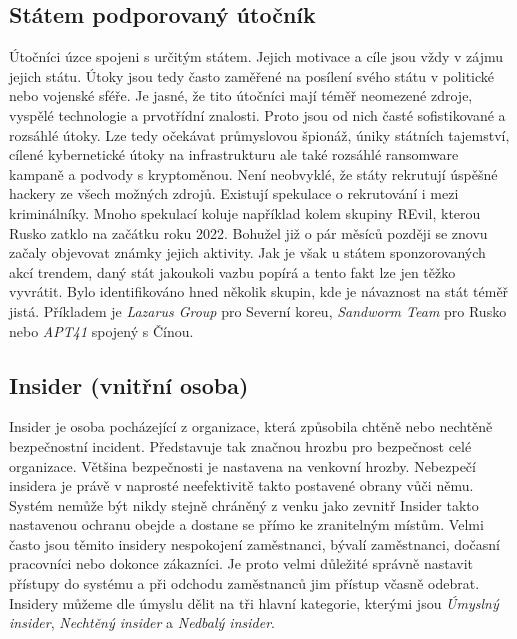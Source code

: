 \subsection{Státem podporovaný útočník}\label{subsec:statem-podporovany-utocnik}
Útočníci úzce spojeni s určitým státem.
Jejich motivace a cíle jsou vždy v zájmu jejich státu.
Útoky jsou tedy často zaměřené na posílení svého státu v politické nebo vojenské sféře.
Je jasné, že tito útočníci mají téměř neomezené zdroje, vyspělé technologie a prvotřídní znalosti.
Proto jsou od nich časté sofistikované a rozsáhlé útoky.
Lze tedy očekávat průmyslovou špionáž, úniky státních tajemství, cílené kybernetické útoky na infrastrukturu ale také rozsáhlé ransomware kampaně a podvody s kryptoměnou.
Není neobvyklé, že státy rekrutují úspěšné hackery ze všech možných zdrojů.
Existují spekulace o rekrutování i mezi kriminálníky.
Mnoho spekulací koluje například kolem skupiny REvil, kterou Rusko zatklo na začátku roku 2022\cite{REvil_story}.
Bohužel již o pár měsíců později se znovu začaly objevovat známky jejich aktivity.
Jak je však u státem sponzorovaných akcí trendem, daný stát jakoukoli vazbu popírá a tento fakt lze jen těžko vyvrátit.
Bylo identifikováno hned několik skupin, kde je návaznost na stát téměř jistá.
Příkladem je \textit{Lazarus Group} pro Severní koreu, \textit{Sandworm Team} pro Rusko nebo \textit{APT41} spojený s Čínou\cite{Mitre_groups}.

\subsection{Insider (vnitřní osoba)}\label{subsec:insider-(vnitrni-osoba)}
Insider je osoba pocházející z organizace, která způsobila chtěně nebo nechtěně bezpečnostní incident.
Představuje tak značnou hrozbu pro bezpečnost celé organizace.
Většina bezpečnosti je nastavena na venkovní hrozby.
Nebezpečí insidera je právě v naprosté neefektivitě takto postavené obrany vůči němu.
Systém nemůže být nikdy stejně chráněný z venku jako zevnitř
Insider takto nastavenou ochranu obejde a dostane se přímo ke zranitelným místům.
Velmi často jsou těmito insidery nespokojení zaměstnanci, bývalí zaměstnanci, dočasní pracovníci nebo dokonce zákazníci.
Je proto velmi důležité správně nastavit přístupy do systému a při odchodu zaměstnanců jim přístup včasně odebrat.
Insidery můžeme dle úmyslu dělit na tři hlavní kategorie, kterými jsou \textit{Úmyslný insider}, \textit{Nechtěný insider} a \textit{Nedbalý insider}.

